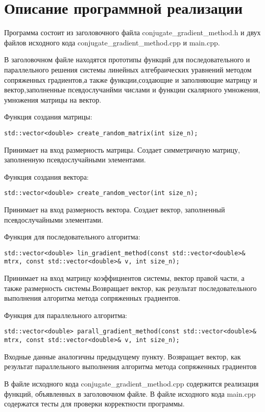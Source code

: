 \documentclass{report}
\begin{document}
\section*{Описание программной реализации}
Программа состоит из заголовочного файла conjugate\_gradient\_method.h и двух файлов исходного кода conjugate\_gradient\_method.cpp и main.cpp.
\par В заголовочном файле находятся прототипы функций для последовательного и параллельного решения системы линейных алгебраических уравнений методом сопряженных градиентов,а также функции,создающие и заполняющие матрицу и вектор,заполненные псевдослучанйми числами и функции скалярного умножения, умножения матрицы на вектор.
\par Функция создания матрицы:
\begin{lstlisting}
std::vector<double> create_random_matrix(int size_n);
\end{lstlisting}
Принимает на вход размерность матрицы. Создает симметричную матрицу, заполненную
псевдослучайными элементами.
\par Функция создания вектора:
\begin{lstlisting}
std::vector<double> create_random_vector(int size_n);
\end{lstlisting}
Принимает на вход размерность вектора. Создает вектор, заполненный псевдослучайными элементами.
\par Функция для последовательного алгоритма:
\begin{lstlisting}
std::vector<double> lin_gradient_method(const std::vector<double>& mtrx, const std::vector<double>& v, int size_n);
\end{lstlisting}
Принимает на вход матрицу коэффициентов системы, вектор правой части, а также размерность системы.Возвращает вектор, как результат последовательного выполнения алгоритма метода сопряженных градиентов. 
\par Функция для параллельного алгоритма:
\begin{lstlisting}
std::vector<double> parall_gradient_method(const std::vector<double>& mtrx, const std::vector<double>& v, int size_n);
\end{lstlisting}
Входные данные аналогичны предыдущему пункту. Возвращает вектор, как результат параллельного выполнения алгоритма метода сопряженных градиентов
\par В файле исходного кода conjugate\_gradient\_method.cpp содержится реализация функций, объявленных в заголовочном файле. В файле исходного кода main.cpp содержатся тесты для проверки корректности программы.
\newpage
\end{document}
